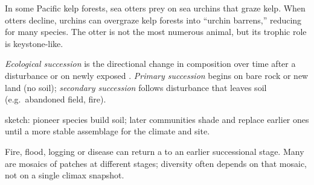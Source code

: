 \begin{example}
\label{ex:g10:ecosystems:otter}
In some Pacific kelp forests, sea otters prey on sea urchins that graze kelp.
When otters decline, urchins can overgraze kelp forests into ``urchin
barrens,'' reducing  for many species. The otter is not the most
numerous animal, but its trophic role is keystone-like.
\end{example}

\begin{definition}
\label{def:g10:ecosystems:succession}
\emph{Ecological succession} is the directional
change in  composition over time after a disturbance or on newly
exposed . \emph{Primary succession} begins
on bare rock or new land (no soil); \emph{secondary succession} follows disturbance that leaves soil (e.g.\ abandoned field, fire).
\end{definition}

\begin{omfigure}

{\small {} sketch: pioneer species build soil; later
communities shade and replace earlier ones until a more stable assemblage
for the climate and site.}
\end{omfigure}

\begin{proposition}
\label{prop:g10:ecosystems:disturbance}
Fire, flood, logging or disease can return a  to an earlier
successional stage. Many  are mosaics of patches at different
stages; diversity often depends on that mosaic, not on a single climax
snapshot.
\end{proposition}
\admitted

